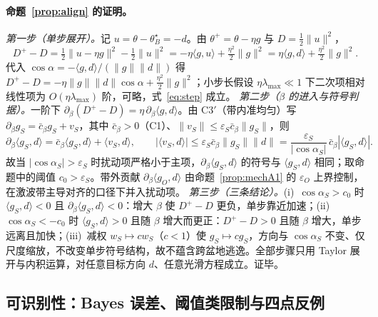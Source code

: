 \documentclass[fontset=windows,11pt]{ctexart}
\numberwithin{equation}{section}
\begin{document}
\paragraph{命题~\ref{prop:align} 的证明。}
\emph{第一步（单步展开）。}记 $u=\theta-\theta_B^\star=-d$。由 $\theta^+=\theta-\eta g$ 与 $D=\tfrac12\|u\|^2$，
\[
D^+-D=\tfrac12\|u-\eta g\|^2-\tfrac12\|u\|^2
=-\eta\langle g,u\rangle+\tfrac{\eta^2}{2}\|g\|^2
=\eta\langle g,d\rangle+\tfrac{\eta^2}{2}\|g\|^2.
\]
代入 $\cos\alpha=-\langle g,d\rangle/(\|g\|\|d\|)$ 得 $D^+-D=-\eta\|g\|\|d\|\cos\alpha+\tfrac{\eta^2}{2}\|g\|^2$；小步长假设 $\eta\lambda_{\max}\ll1$ 下二次项相对线性项为 $O(\eta\lambda_{\max})$ 阶，可略，式~\eqref{eq:step} 成立。
\emph{第二步（$\beta$ 的进入与符号判据）。}一阶下 $\partial_\beta(D^+-D)=\eta\,\partial_\beta\langle g,d\rangle$。由 C3$'$（带内准均匀）写 $\partial_\beta g_S=\bar c_\beta g_S+v_S$，其中 $\bar c_\beta>0$（C1）、$\|v_S\|\le\varepsilon_S\bar c_\beta\|g_S\|$，则
\[
\partial_\beta\langle g_S,d\rangle=\bar c_\beta\langle g_S,d\rangle+\langle v_S,d\rangle,\qquad
|\langle v_S,d\rangle|\le\varepsilon_S\bar c_\beta\|g_S\|\|d\|=\frac{\varepsilon_S}{|\cos\alpha_S|}\,\bar c_\beta|\langle g_S,d\rangle|.
\]
故当 $|\cos\alpha_S|>\varepsilon_S$ 时扰动项严格小于主项，$\partial_\beta\langle g_S,d\rangle$ 的符号与 $\langle g_S,d\rangle$ 相同；取命题中的阈值 $c_0>\varepsilon_S$。带外贡献 $\partial_\beta\langle g_O,d\rangle$ 由命题~\ref{prop:mechA1} 的 $\varepsilon_O$ 上界控制，在激波带主导对齐的口径下并入扰动项。
\emph{第三步（三条结论）。}(i)~$\cos\alpha_S>c_0$ 时 $\langle g_S,d\rangle<0$ 且 $\partial_\beta\langle g_S,d\rangle<0$：增大 $\beta$ 使 $D^+-D$ 更负，单步靠近加速；(ii)~$\cos\alpha_S<-c_0$ 时 $\langle g_S,d\rangle>0$ 且随 $\beta$ 增大而更正：$D^+-D>0$ 且随 $\beta$ 增大，单步远离且加快；(iii)~减权 $w_S\mapsto cw_S$（$c<1$）使 $g_S\mapsto cg_S$，方向与 $\cos\alpha_S$ 不变、仅尺度缩放，不改变单步符号结构，故不蕴含跨盆地逃逸。全部步骤只用 Taylor 展开与内积运算，对任意目标方向 $d$、任意光滑方程成立。证毕。

\subsection{可识别性：Bayes 误差、阈值类限制与四点反例}
\end{document}
